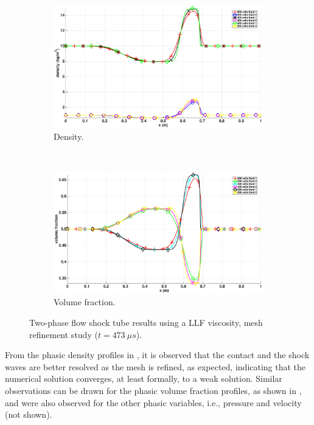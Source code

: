 \begin{figure}[H]
        \centering
        \begin{subfigure}[b]{0.95\textwidth}
                \centering
                \includegraphics[width=\textwidth]{figures/relaxation_two_phases_density_multi_mesh.eps}
                \caption{Density.}
                \label{fig:density-mult-meshes}
        \end{subfigure}
				\\
        \begin{subfigure}[b]{0.95\textwidth}
                \centering
                \includegraphics[width=\textwidth]{figures/relaxation_two_phases_volume_fraction_multi_mesh.eps}
                \caption{Volume fraction.}
                \label{fig:vf-mult-meshes}
        \end{subfigure}
        \caption{Two-phase flow shock tube results using a LLF viscosity, mesh refinement study ($t=473 \ \mu s$).}
				\label{fig:density-vf-mult-mesh}
\end{figure}
%
From the phasic density profiles in , it is observed that the contact and the shock waves are better resolved as the mesh is refined, as expected, indicating that the numerical solution converges, at least formally, to a weak solution. Similar observations can be drawn for the phasic volume fraction profiles, as shown in , and were also observed for the other phasic variables, i.e., pressure and velocity (not shown).
%
